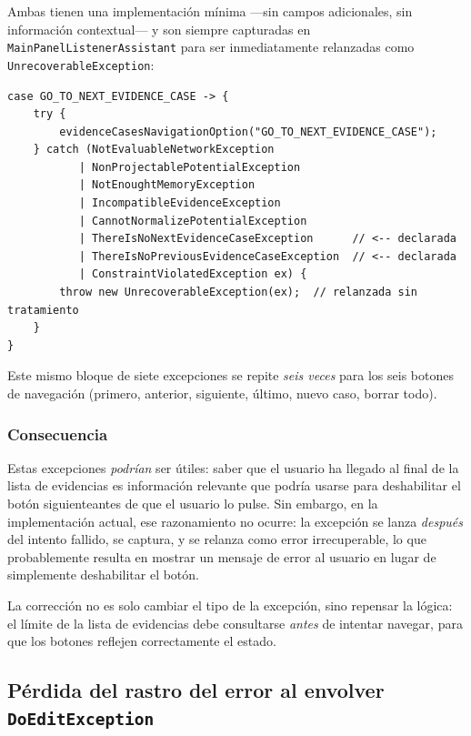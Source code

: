 \documentclass[11pt,a4paper]{article}
\begin{document}
Ambas tienen una implementación mínima —sin campos adicionales, sin información contextual— y
son siempre capturadas en \texttt{MainPanelListenerAssistant} para ser inmediatamente relanzadas
como \texttt{UnrecoverableException}:

\begin{lstlisting}[caption={Patrón real de uso de estas excepciones en la GUI},label={lst:evidence-nav}]
case GO_TO_NEXT_EVIDENCE_CASE -> {
    try {
        evidenceCasesNavigationOption("GO_TO_NEXT_EVIDENCE_CASE");
    } catch (NotEvaluableNetworkException
           | NonProjectablePotentialException
           | NotEnoughtMemoryException
           | IncompatibleEvidenceException
           | CannotNormalizePotentialException
           | ThereIsNoNextEvidenceCaseException      // <-- declarada
           | ThereIsNoPreviousEvidenceCaseException  // <-- declarada
           | ConstraintViolatedException ex) {
        throw new UnrecoverableException(ex);  // relanzada sin tratamiento
    }
}
\end{lstlisting}

Este mismo bloque de siete excepciones se repite \emph{seis veces} para los seis botones de
navegación (primero, anterior, siguiente, último, nuevo caso, borrar todo).

\subsubsection{Consecuencia}

Estas excepciones \emph{podrían} ser útiles: saber que el usuario ha llegado al final de la
lista de evidencias es información relevante que podría usarse para deshabilitar el botón
\guillemotleft siguiente\guillemotright  antes de que el usuario lo pulse. Sin embargo, en la implementación actual, ese
razonamiento no ocurre: la excepción se lanza \emph{después} del intento fallido, se captura,
y se relanza como error irrecuperable, lo que probablemente resulta en mostrar un mensaje de
error al usuario en lugar de simplemente deshabilitar el botón.

La corrección no es solo cambiar el tipo de la excepción, sino repensar la lógica: el límite
de la lista de evidencias debe consultarse \emph{antes} de intentar navegar, para que los
botones reflejen correctamente el estado.

\subsection{Pérdida del rastro del error al envolver \texttt{DoEditException}}
\end{document}
